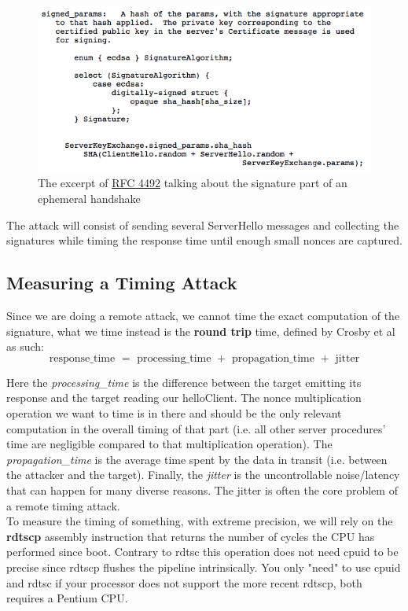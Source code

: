 \documentclass[a4paper,11pt]{article}
\begin{document}
\begin{figure}[H]
\includegraphics[width=\textwidth]{ecdsa_rfc4492.png}
\caption{The excerpt of \href{https://tools.ietf.org/html/rfc4492#section-5.4}{RFC 4492} talking about the signature part of an ephemeral handshake}
\end{figure}

The attack will consist of sending several ServerHello messages and collecting the signatures while timing the response time until enough small nonces are captured.

\subsection{Measuring a Timing Attack}

Since we are doing a remote attack, we cannot time the exact computation of the signature, what we time instead is the \textbf{round trip} time, defined by Crosby et al\cite{crosby} as such:
$$ \text{response\_time } = \text{ processing\_time } + \text{ propagation\_time } + \text{ jitter} $$

Here the \textit{processing\_time} is the difference between the target emitting its response and the target reading our helloClient. The nonce multiplication operation we want to time is in there and should be the only relevant computation in the overall timing of that part (i.e. all other server procedures' time are negligible compared to that multiplication operation). The \textit{propagation\_time} is the average time spent by the data in transit (i.e. between the attacker and the target). Finally, the \textit{jitter} is the uncontrollable noise/latency that can happen for many diverse reasons. The jitter is often the core problem of a remote timing attack.\\

To measure the timing of something, with extreme precision, we will rely on the \textbf{rdtscp} assembly instruction that returns the number of cycles the CPU has performed since boot. Contrary to rdtsc this operation does not need cpuid to be precise since rdtscp flushes the pipeline intrinsically. You only "need" to use cpuid and rdtsc if your processor does not support the more recent rdtscp, both requires a Pentium CPU.
\end{document}
